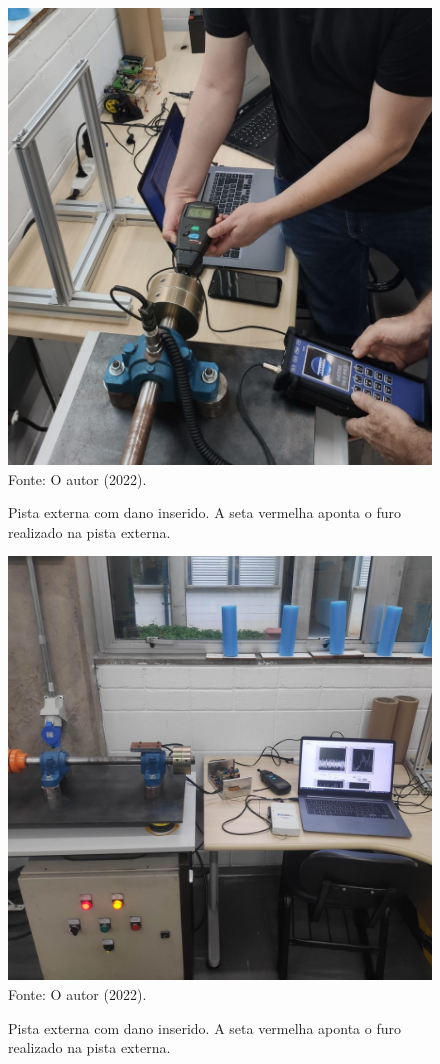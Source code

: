\documentclass[
	12pt,				
	oneside,			
	a4paper,			
	english,			
	brazil,			
	]{abntex2ppgsi}
\begin{document}
\begin{figure}[H]
\centering
\caption {Pista externa com dano inserido. A seta vermelha aponta o furo realizado na pista externa.}
\includegraphics[width=\textwidth,keepaspectratio]{experimento_acelerometro} \\
Fonte: O autor (2022).
\label{dano_pista_externa}
\end{figure}

\begin{figure}[H]
\centering
\caption {Pista externa com dano inserido. A seta vermelha aponta o furo realizado na pista externa.}
\includegraphics[width=\textwidth,keepaspectratio]{setup_experimental_pvdf} \\
Fonte: O autor (2022).
\label{dano_pista_externa}
\end{figure}
\end{document}
